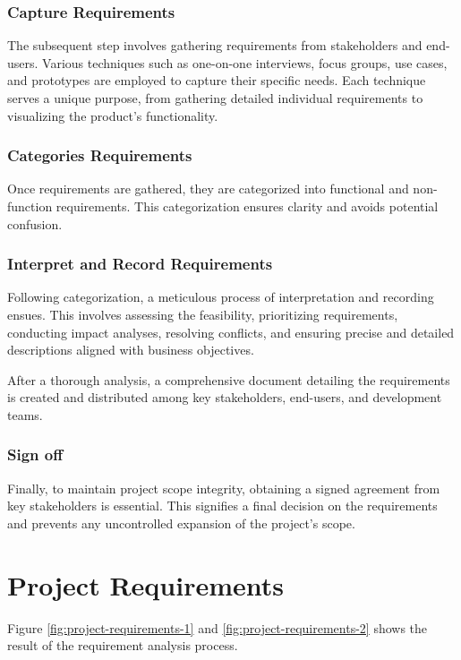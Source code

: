 \subsubsection{Capture Requirements}
The subsequent step involves gathering requirements from stakeholders and end-users. Various techniques such as one-on-one interviews, focus groups, use cases, and prototypes are employed to capture their specific needs. Each technique serves a unique purpose, from gathering detailed individual requirements to visualizing the product's functionality.

\subsubsection{Categories Requirements}
Once requirements are gathered, they are categorized into functional and non-function requirements. This categorization ensures clarity and avoids potential confusion.


\subsubsection{Interpret and Record Requirements}
Following categorization, a meticulous process of interpretation and recording ensues. This involves assessing the feasibility, prioritizing requirements, conducting impact analyses, resolving conflicts, and ensuring precise and detailed descriptions aligned with business objectives.

After a thorough analysis, a comprehensive document detailing the requirements is created and distributed among key stakeholders, end-users, and development teams.

\subsubsection{Sign off}
Finally, to maintain project scope integrity, obtaining a signed agreement from key stakeholders is essential. This signifies a final decision on the requirements and prevents any uncontrolled expansion of the project's scope.

\section{Project Requirements}
\label{section:project-requirements}
Figure \ref{fig:project-requirements-1} and \ref{fig:project-requirements-2} shows the result of the requirement analysis process.

